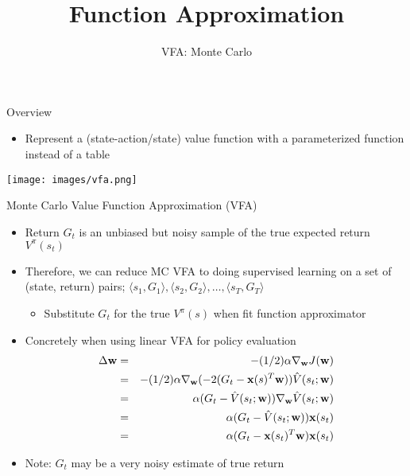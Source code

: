\documentclass[aspectratio=169]{../latex_main/tntbeamer}  %
\title[RL: Function Approximation]{Function Approximation}
\subtitle{VFA: Monte Carlo}
\begin{document}
	
	\maketitle

\begin{frame}[c]{Overview}
	
	
\begin{itemize}
	\item Represent a (state-action/state) value function with a parameterized
	function instead of a table
\end{itemize}

\begin{center}
	\texttt{[image: images/vfa.png]}
\end{center}


\end{frame}
\begin{frame}[c]{Monte Carlo Value Function Approximation (VFA)}
	\begin{itemize}
		\item Return $G_t$ is an unbiased but noisy sample of the true expected return $V^\pi(s_t)$
		\item Therefore, we can reduce MC VFA to doing supervised learning on a set of (state, return) pairs; $\langle s_1, G_1 \rangle, \langle s_2, G_2 \rangle,\ldots, \langle s_T, G_T \rangle$
		\begin{itemize}
			\item Substitute $G_t$ for the true $V^\pi(s)$ when fit function approximator
		\end{itemize}
		\item Concretely when using linear VFA for policy evaluation
		\vspace{-.2cm}
		\begin{eqnarray*}
		 \Delta \mathbf{w} &=&- (1/2) \alpha \nabla_{\mathbf{w}} J (\mathbf{w})\\
          &=& - (1/2) \alpha \nabla_{\mathbf{w}} (-2(G_t - \mathbf{x}(s)^T \mathbf{w})) \hat{V}(s_t; \mathbf{w})\\
          &=& \alpha (G_t - \hat{V} (s_t; \mathbf{w})) \nabla_{\mathbf{w}}\hat{V}(s_t; \mathbf{w}) \\
		 &=& \alpha (G_t - \hat{V} (s_t; \mathbf{w})) \mathbf{x}(s_t)\\
		 &=& \alpha (G_t - \mathbf{x}(s_t)^T \mathbf{w}) \mathbf{x}(s_t)
		\end{eqnarray*}
		
		\item Note: $G_t$ may be a very noisy estimate of true return
	\end{itemize}
	
\end{frame}
\end{document}
